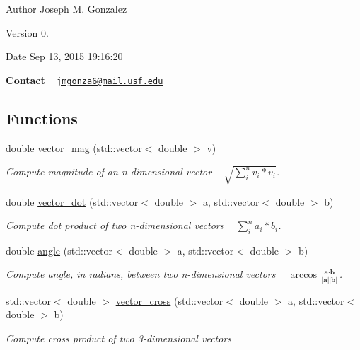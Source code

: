\begin{DoxyAuthor}{Author}
Joseph M. Gonzalez
\end{DoxyAuthor}
\begin{DoxyVersion}{Version}
0.
\end{DoxyVersion}
\begin{DoxyDate}{Date}
Sep 13, 2015 19\+:16\+:20
\end{DoxyDate}
{\bfseries Contact} ~\newline
 \href{mailto:jmgonza6@mail.usf.edu}{\tt jmgonza6@mail.\+usf.\+edu} \subsection*{Functions}
\begin{DoxyCompactItemize}
\item 
double \hyperlink{namespace_m_a_t_h_n_s_acfac6bea334e370b6653af175dcbf497}{vector\+\_\+mag} (std\+::vector$<$ double $>$ v)
\begin{DoxyCompactList}\small\item\em Compute magnitude of an n-\/dimensional vector ~\newline
 $ \sqrt{\sum_{i}^{n} v_{i}*v_{i} } $. \end{DoxyCompactList}\item 
double \hyperlink{namespace_m_a_t_h_n_s_ada18bcb2b79a242de1850736eae08e7d}{vector\+\_\+dot} (std\+::vector$<$ double $>$ a, std\+::vector$<$ double $>$ b)
\begin{DoxyCompactList}\small\item\em Compute dot product of two n-\/dimensional vectors ~\newline
 $ \sum_{i}^{n} a_{i}*b_{i} $. \end{DoxyCompactList}\item 
double \hyperlink{namespace_m_a_t_h_n_s_a022918208f2c3ec4e5526a1df3d0ad45}{angle} (std\+::vector$<$ double $>$ a, std\+::vector$<$ double $>$ b)
\begin{DoxyCompactList}\small\item\em Compute angle, in radians, between two n-\/dimensional vectors ~\newline
 $ \arccos \frac{\textbf{a} \cdot \textbf{b}}{|\textbf{a}||\textbf{b}|} $. \end{DoxyCompactList}\item 
std\+::vector$<$ double $>$ \hyperlink{namespace_m_a_t_h_n_s_a764510ef75ba546ef7b8c9b234757d39}{vector\+\_\+cross} (std\+::vector$<$ double $>$ a, std\+::vector$<$ double $>$ b)
\begin{DoxyCompactList}\small\item\em Compute cross product of two 3-\/dimensional vectors ~\newline

\end{DoxyCompactList}
\end{DoxyCompactItemize}
